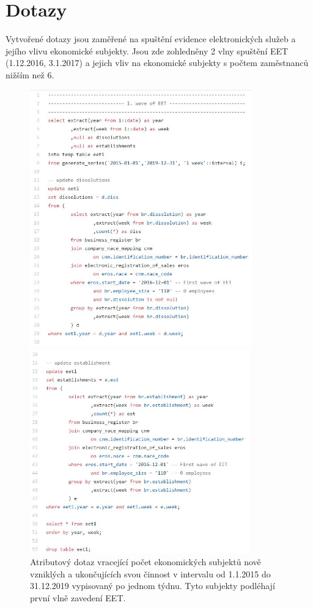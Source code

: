 \documentclass[a4paper, 12pt]{article}
\begin{document}
\section{Dotazy}
Vytvořené dotazy jsou zaměřené na spuštění evidence elektronických služeb a jejího vlivu ekonomické subjekty. Jsou zde zohledněny 2 vlny spuštění EET (1.12.2016, 3.1.2017) a jejich vliv na ekonomické subjekty s počtem zaměstnanců nižším než 6.

\newpage
\begin{figure}[h!]
	\centering
	\includegraphics[width=9.6cm]{EET1_A.jpg}

	\centering
	\includegraphics[width=9.5cm]{EET1_A2.jpg}
	\caption{Atributový dotaz vracející počet ekonomických subjektů nově vzniklých a ukončujících svou činnost v intervalu od 1.1.2015 do 31.12.2019 vypisovaný po jednom týdnu. Tyto subjekty podléhají první vlně zavedení EET.}
\end{figure}
\end{document}
